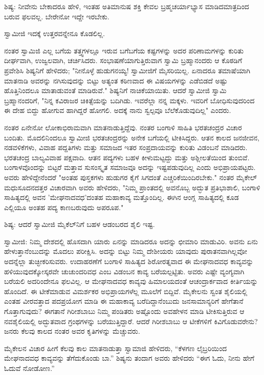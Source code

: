 ಶಿಷ್ಯ: ನೀವೇನು ಬೇಕಾದರೂ ಹೇಳಿ, ಇಂತಹ ಅತಿಮಾನುಷ ಶಕ್ತಿ ಕೇವಲ ಬ್ರಹ್ಮಚರ್ಯಾಭ್ಯಾಸ ಮಾಡಿದಮಾತ್ರದಿಂದ ಬರುವ ಫಲವಲ್ಲ. ಬೇರೇನೋ ಇದ್ದೇ ಇರಬೇಕು.

ಸ್ವಾಮೀಜಿ ಇದಕ್ಕೆ ಉತ್ತರವನ್ನೇನೂ ಕೊಡಲಿಲ್ಲ.

ನಂತರ ಸ್ವಾಮಿಜಿ ಎಲ್ಲ ಬಗೆಯ ತತ್ತ್ವಗಳಲ್ಲೂ ಇರುವ ಬಗೆಬಗೆಯ ಕಷ್ಟಗಳನ್ನು ಅದರ ಪರಿಣಾಮಗಳನ್ನು ಕುರಿತು ದೀರ್ಘವಾಗಿ, ಉಜ್ವಲವಾಗಿ, ಚರ್ಚಿಸಿದರು. ಸಂಭಾಷಣೆಯಾಗುತ್ತಿರುವಾಗ ಸ್ವಾಮಿ ಬ್ರಹ್ಮಾನಂದರು ಆ ಕೊಠಡಿಗೆ ಪ್ರವೇಶಿಸಿ ಶಿಷ್ಯನಿಗೆ ಹೇಳಿದರು; "ನೀನೊಳ್ಳೆ ಹುಡುಗನಯ್ಯ! ಸ್ವಾಮೀಜಿಗೆ ಮೈಸರಿಯಿಲ್ಲ. ಏನಾದರೂ ತಮಾಷೆಯಾಗಿ ಮಾತನಾಡಿ ಅವರನ್ನು ನಗಿಸುವುದನ್ನು ಬಿಟ್ಟು ಅತ್ಯಂತ ಕಠಿಣವಾದ ಈ ವಿಷಯಗಳನ್ನು ಎಡೆಬಿಡದೆ ಅಷ್ಟು ಹೊತ್ತಿನಿಂದಲೂ ಮಾತಾಡುವಂತೆ ಮಾಡಿರುವೆ." ಶಿಷ್ಯನಿಗೆ ನಾಚಿಕೆಯಾಯಿತು. ಆದರೆ ಸ್ವಾಮೀಜಿ ಸ್ವಾಮಿ ಬ್ರಹ್ಮಾನಂದರಿಗೆ, "ನಿನ್ನ ಕವಿರಾಜರ ಚಿಕಿತ್ಸೆಯನ್ನು ಬದಿಗಿಡು. ಇವರೆಲ್ಲಾ ನನ್ನ ಮಕ್ಕಳು. ಇವರಿಗೆ ಬೋಧಿಸುವುದರಿಂದ ಈ ದೇಹ ಬಿದ್ದು ಹೋಗುವ ಹಾಗಿದ್ದರೆ ಹೋಗಲಿ. ಅದಕ್ಕೆ ನಾನು ಸ್ವಲ್ಪವೂ ಬೆಲೆಕೊಡುವುದಿಲ್ಲ" ಎಂದರು.

ನಂತರ ಏನೇನೋ ಲೋಕಾಭಿರಾಮವಾಗಿ ಮಾತನಾಡುತ್ತಿದ್ದೆವು. ನಂತರ ಬಂಗಾಳಿ ಸಾಹಿತಿ ಭರತಚಂದ್ರರ ವಿಚಾರ ಬಂದಿತು. ಮೊದಲಿನಿಂದಲೂ ಸ್ವಾಮೀಜಿ ಭರತಚಂದ್ರರನ್ನು ಅನೇಕ ಬಗೆಯಲ್ಲಿ ಟೀಕಿಸಿದ್ದರು. ಆತನ ಕಾಲದ ಜನಜೀವನ, ನಡವಳಿಕೆಗಳು, ವಿವಾಹ ಪದ್ದತಿಗಳು ಮತ್ತು ಸಮಾಜದ ಇತರ ಸಂಪ್ರದಾಯವನ್ನು ಕುರಿತು ವಿಡಂಬನೆ ಮಾಡಿದರು. ಭರತಚಂದ್ರ ಬಾಲ್ಯವಿವಾಹ ಪಕ್ಷವಾದಿ. ಆತನ ಪದ್ಯಗಳು ಬಹಳ ಕೀಳುಮಟ್ಟದ್ದು ಮತ್ತು ಅಶ್ಲೀಲತೆಯಿಂದ ತುಂಬಿವೆ. ಬಂಗಾಳವೊಂದನ್ನು ಬಿಟ್ಟರೆ ಮತ್ತಾವ ಸುಸಂಸ್ಕೃತ ಸಮಾಜವೂ ಅದನ್ನು ಇಷ್ಟಪಡುವುದಿಲ್ಲ ಎಂದು ಅಭಿಪ್ರಾಯಪಟ್ಟರು. ಅವರು ಹೇಳಿದ್ದೇನೆಂದರೆ "ಅಂತಹ ಪುಸ್ತಕಗಳು ಹುಡುಗರ ಕೈಗೆ ಸಿಗದಂತೆ ಎಚ್ಚರಿಕೆಯಿಂದಿರಬೇಕು." ನಂತರ ಮೈಕೇಲ್ ಮಧುಸೂದನದತ್ತರ ವಿಚಾರವಾಗಿ ಅವರು ಹೇಳಿದರು, "ನಿಮ್ಮ ಪ್ರಾಂತದಲ್ಲಿ ಅವನೊಬ್ಬ ಅದ್ಭುತ ಪ್ರತಿಭಾಶಾಲಿ, ಬಂಗಾಳಿ ಸಾಹಿತ್ಯದಲ್ಲಿ ಅವನ 'ಮೇಘನಾದವಧ'ದಂತಹ ಮಹಾಕಾವ್ಯ ಮತ್ತೊಂದಿಲ್ಲ. ಈಗಿನ ಆಂಗ್ಲ ಸಾಹಿತ್ಯದಲ್ಲಿ ಕೂಡ ಎಲ್ಲಿಯೂ ಅಂತಹ ಪದ್ಯ ಕಾಣಬರುವುದು ಅಪರೂಪ."

ಶಿಷ್ಯ: ಆದರೆ ಸ್ವಾಮೀಜಿ ಮೈಕೆಲ್‌ನಿಗೆ ಬಹಳ ಆಡಂಬರದ ಶೈಲಿ ಇಷ್ಟ.

ಸ್ವಾಮೀಜಿ: ನಿಮ್ಮ ದೇಶದಲ್ಲಿ ಹೊಸದಾಗಿ ಯಾರು ಏನನ್ನು ಮಾಡಿದರೂ ಅದನ್ನು ಛೀಮಾರಿ ಮಾಡುವಿರಿ. ಅವನು ಏನು ಹೇಳುತ್ತಾನೆಂಬುದನ್ನು ಮೊದಲು ಪರೀಕ್ಷಿಸಿ. ಅದನ್ನು ಬಿಟ್ಟು ನಿಮ್ಮ ದೇಶೀಯರು ಯಾವುದು ಪುರಾತನವಾಗಿಲ್ಲವೋ ಅದನ್ನೆಲ್ಲಾ ತುಚ್ಛೀಕರಿಸುವರು. ಉದಾಹರಣೆಗೆ ಬಂಗಾಳಿ ಸಾಹಿತ್ಯದ ಶಿರೋರತ್ನವಾದ ಈ ಮೇಘನಾದವಧ ಕಾವ್ಯವನ್ನು ಹಳಿಯುವುದಕ್ಕೋಸ್ಕರವೇ ಚುಚುಂದರಿವಧ ಎಂಬ ವಿಡಂಬನ ಕಾವ್ಯ ಬರೆಯಲ್ಪಟ್ಟಿತು. ಅವರು ಎಷ್ಟೇ ವ್ಯಂಗ್ಯವಾಗಿ ಬರೆಯಲಿ ಅದರಿಂದೇನೂ ಫಲವಿಲ್ಲ. ಆ ಮೇಘನಾದವಧ ಕಾವ್ಯವು ಹಿಮಾಲಯದಂತೆ ಆಚಂದ್ರಾರ್ಕವಾದ ಕೀರ್ತಿಯನ್ನು ಹೊಂದಿದೆ. ಈ ಟೀಕೆಮಾಡುವ ವಿಮರ್ಶಕರ ಅಭಿಪ್ರಾಯಗಳೆಲ್ಲ ಮೂಲೆಗೆ ಬಿದ್ದಿವೆ. ಮೈಕೇಲನು ಸ್ವಂತ ಶೈಲಿಯಲ್ಲಿ ಎಂತಹ ವೀರವತ್ತಾದ ಪದಪ್ರಯೋಗ ಮಾಡಿ ಈ ಮಹಾಕಾವ್ಯ ಬರೆದಿದ್ದಾನೆಂಬುದು ಜನಸಾಮಾನ್ಯರಿಗೆ ಹೇಗೆತಾನೆ ಗೊತ್ತಾಗುವುದು? ಈಗತಾನೆ ಗಿರೀಶಬಾಬು ನಿಮ್ಮ ಪಂಡಿತರು ಅಷ್ಟೊಂದು ಅವಹೇಳನ ಮಾಡಿ ಟೀಕಿಸುತ್ತಿರುವ ಆ ನವಶೈಲಿಯಲ್ಲಿ ಅದ್ಭುತವಾದ ಗ್ರಂಥಗಳನ್ನು ಬರೆಯುತ್ತಿದ್ದಾರೆ. ಆದರೆ ಗಿರೀಶಬಾಬು ಆ ಟೀಕೆಗಳಿಗೆ ಕಿವಿಗೊಡುವರೇನು? ಜನರು ಕೆಲವು ಕಾಲದ ನಂತರ ಅವರ ಕೃತಿಗಳನ್ನು ಮೆಚ್ಚುವರು.

ಮೈಕೇಲನ ವಿಚಾರ ಹೀಗೆ ಕೆಲವು ಕಾಲ ಮಾತನಾಡುತ್ತಾ ಸ್ವಾಮಾಜಿ ಹೇಳಿದರು, “ಕೆಳಗಣ ಲೈಬ್ರರಿಯಿಂದ ಮೇಘನಾದವಧ ಕಾವ್ಯವನ್ನು ತೆಗೆದುಕೊಂಡು ಬಾ.” ಶಿಷ್ಯನು ತಂದಾಗ ಅವರು ಹೇಳಿದರು “ಈಗ ಓದು, ನೀನು ಹೇಗೆ ಓದುವೆ ನೋಡೋಣ.”

